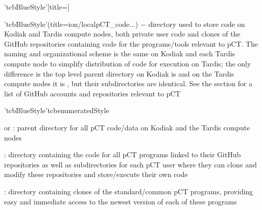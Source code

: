 \begin{tcbenvironment}'tcbBlueStyle'[title=]
\begin{tcbparagraph}'tcbBlueStyle'(title=\dirsep ion/local\dirsep pCT\_code\dirsep$\dots$)
$\boldsymbol{-}$ directory used to store code on Kodiak and Tardis compute nodes, both private user code and clones of the GitHub repositories containing code for the programs/tools relevant to pCT.  The naming and organizational scheme is the same on Kodiak and each Tardis compute node to simplify distribution of code for execution on Tardis; the only difference is the top level parent directory on Kodiak is  and on the Tardis compute nodes it is , but their subdirectories are identical.  See the  section for a list of GitHub accounts and repositories relevant to pCT
\end{tcbparagraph}
\begin{tcbparagraph}'tcbBlueStyle'{tcbenumeratedStyle}
\begin{ThinEnum}[labelindent=1pt, leftmargin=*]
	\item {} or  : parent directory for all pCT code/data on Kodiak and the Tardis compute nodes
    	\begin{ThinEnum}[labelindent=1pt, leftmargin=*]
        	\item {} : directory containing the code for all pCT programs linked to their GitHub repositories as well as subdirectories for each pCT user where they can clone and modify these repositories and store/execute their own code
	    	\begin{ThinEnum}[labelindent=1pt, leftmargin=*]
	        	\item {} : directory containing clones of the standard/common pCT programs, providing easy and immediate access to the newest version of each of these programs
	    		\begin{ThinEnum}[labelindent=1pt, leftmargin=*]

\end{ThinEnum}
\end{ThinEnum}
\end{ThinEnum}
\end{ThinEnum}
\end{tcbparagraph}
\end{tcbenvironment}
